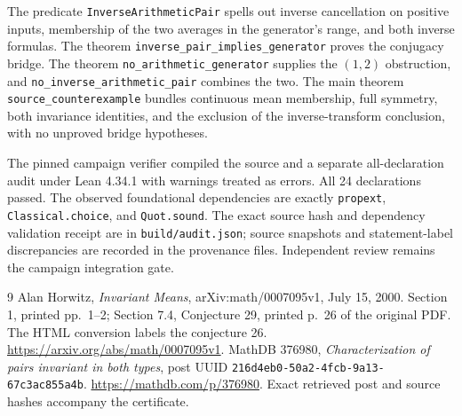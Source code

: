 \documentclass[11pt]{article}
\begin{document}
The predicate \texttt{InverseArithmeticPair} spells out inverse cancellation on positive inputs, membership of the two averages in the generator's range, and both inverse formulas. The theorem \texttt{inverse\_pair\_implies\_generator} proves the conjugacy bridge. The theorem \texttt{no\_arithmetic\_generator} supplies the $(1,2)$ obstruction, and \texttt{no\_inverse\_arithmetic\_pair} combines the two. The main theorem \texttt{source\_counterexample} bundles continuous mean membership, full symmetry, both invariance identities, and the exclusion of the inverse-transform conclusion, with no unproved bridge hypotheses.

The pinned campaign verifier compiled the source and a separate all-declaration audit under Lean 4.34.1 with warnings treated as errors. All 24 declarations passed. The observed foundational dependencies are exactly \texttt{propext}, \texttt{Classical.choice}, and \texttt{Quot.sound}. The exact source hash and dependency validation receipt are in \texttt{build/audit.json}; source snapshots and statement-label discrepancies are recorded in the provenance files. Independent review remains the campaign integration gate.

\begin{thebibliography}{9}
 Alan Horwitz, \emph{Invariant Means}, arXiv:math/0007095v1, July 15, 2000. Section 1, printed pp.~1--2; Section 7.4, Conjecture 29, printed p.~26 of the original PDF. The HTML conversion labels the conjecture 26. \url{https://arxiv.org/abs/math/0007095v1}.
 MathDB 376980, \emph{Characterization of pairs invariant in both types}, post UUID \texttt{216d4eb0-50a2-4fcb-9a13-67c3ac855a4b}. \url{https://mathdb.com/p/376980}. Exact retrieved post and source hashes accompany the certificate.
\end{thebibliography}
\end{document}
